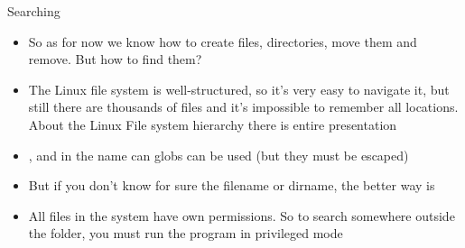 \documentclass[usenames,dvipsnames,10pt,aspectratio=169]{beamer}
\begin{document}
\begin{frame}{Searching}
    \begin{itemize}
        \item So as for now we know how to create files, directories, move them and remove. But how to find them?
        \item The Linux file system is well-structured, so it's very easy to navigate it, but still there are thousands of files and it's impossible to remember all locations. About the Linux File system hierarchy there is entire presentation
        \item {}, and in the name can globs can be used (but they must be escaped)
        \item But if you don't know for sure the filename or dirname, the better way is 
        \item {} All files in the system have own permissions. So to search somewhere outside the  folder, you must run the program in privileged mode
        
    \end{itemize}
\end{frame}
\end{document}
